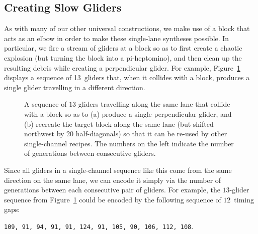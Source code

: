 \subsection{Creating Slow Gliders}\label{sec:single_channel_create_perp_glider}

As with many of our other universal constructions, we make use of a block that acts as an elbow in order to make these single-lane syntheses possible. In particular, we fire a stream of gliders at a block so as to first create a chaotic explosion (but turning the block into a pi-heptomino), and then clean up the resulting debris while creating a perpendicular glider. For example, Figure~\ref{fig:90_degree_first_example} displays a sequence of 13~gliders that, when it collides with a block, produces a single glider travelling in a different direction.

\begin{figure}[!htb]
	\centering
	\caption{A sequence of $13$ gliders travelling along the same lane that collide with a block so as to (a) produce a single perpendicular glider, and (b) recreate the target block along the same lane (but shifted northwest by 20 half-diagonals) so that it can be re-used by other single-channel recipes. The numbers on the left indicate the number of generations between consecutive gliders.}\label{fig:90_degree_first_example}
\end{figure}

Since all gliders in a single-channel sequence like this come from the same direction on the same lane, we can encode it simply via the number of generations between each consecutive pair of gliders. For example, the $13$-glider sequence from Figure~\ref{fig:90_degree_first_example} could be encoded by the following sequence of $12$~timing gaps:
\begin{center}
	\texttt{109, 91, 94, 91, 91, 124, 91, 105, 90, 106, 112, 108}.
\end{center}

